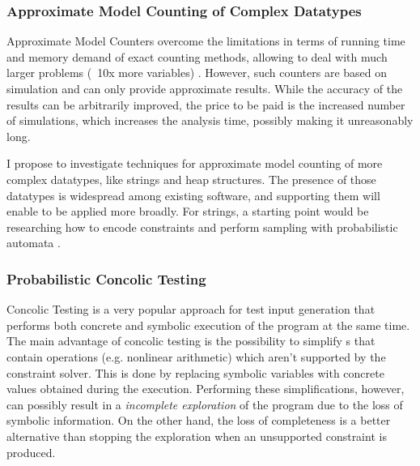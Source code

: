 \documentclass[10pt]{article}
\newcounter{list}
\begin{document}
\subsubsection{ Approximate Model Counting of Complex Datatypes}

Approximate Model Counters overcome the limitations in terms of
running time and memory demand of exact counting methods, allowing to
deal with much larger problems (~10x more variables)
\cite{biere2009handbook}.  However, such counters are based on
simulation and can only provide approximate results. While the
accuracy of the results can be arbitrarily improved, the price to be
paid is the increased number of simulations, which increases the
analysis time, possibly making it unreasonably long. 

I propose to investigate techniques for approximate model counting of
more complex datatypes, like strings and heap structures. The presence
of those datatypes is widespread among existing software, and
supporting them will enable \PSE{} to be applied more broadly. For
strings, a starting point would be researching how to encode
constraints and perform sampling with probabilistic automata
\cite{vidal2005probabilistic}. 




\subsubsection{ Probabilistic Concolic Testing }
\label{concolic}
Concolic Testing \cite{godefroid2005dart} is a very
popular approach for test input generation \cite{cadar2011symbolic}
that performs both concrete and symbolic execution of the program at
the same time. The main advantage of concolic testing is the
possibility to simplify \PC s that contain operations (e.g. nonlinear
arithmetic) which aren't supported by the constraint solver. This is done by
replacing symbolic variables with concrete values obtained during the
execution. Performing these simplifications, however, can possibly result in
a \textit{incomplete exploration} of the program due to the loss of
symbolic information. On the other hand, the loss of completeness is a
better alternative than stopping the exploration when an unsupported
constraint is produced.
\end{document}
